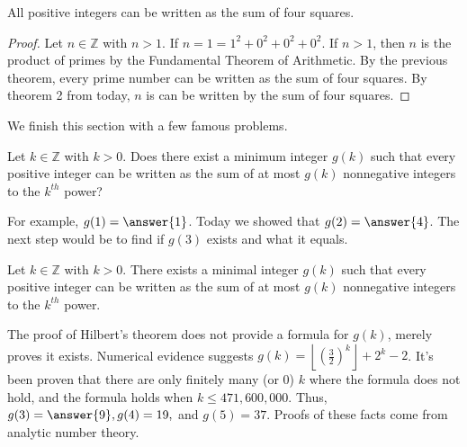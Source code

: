 \documentclass{ximera}
\begin{document}
\begin{theorem}[Lagrange] All positive integers can be written as the sum of four squares.
\end{theorem}
\begin{proof}
 Let $n\in\mathbb{Z}$ with $n>1$. If $n=1=1^2+0^2+0^2+0^2$. If $n>1$, then $n$ is the product of primes by the Fundamental Theorem of Arithmetic. By the previous theorem, every prime number can be written as the sum of four squares. By theorem 2 from today, $n$ is can be written by the sum of four squares.
\end{proof}

We finish this section with a few famous problems.
\begin{example}
 Let $k\in\mathbb{Z}$ with $k>0$. Does there exist a minimum integer $g(k)$ such that every positive integer can be written as the sum of at most $g(k)$ nonnegative integers to the $k^{th}$ power?
 \end{example}
 For example, $g(1)=\answer{1}$. Today we showed that $g(2)=\answer{4}$. The next step would be to find if $g(3)$ exists and what it equals.
 
 
\begin{theorem}[Hilbert, 1906]
 Let $k\in\mathbb{Z}$ with $k>0$. There exists a minimal integer $g(k)$ such that every positive integer can be written as the sum of at most $g(k)$ nonnegative integers to the $k^{th}$ power.
\end{theorem}
The proof of Hilbert's theorem does not provide a formula for $g(k)$, merely proves it exists. Numerical evidence suggests $g(k)=\left\lfloor\left(\frac{3}{2}\right)^k\right\rfloor+2^k-2$. It's been proven that there are only finitely many (or 0) $k$ where the formula does not hold, and the formula holds when $k\leq 471,600,000$. Thus, $g(3)=\answer{9},g(4)=19,$ and $g(5)=37$. Proofs of these facts come from analytic number theory.
\end{document}
